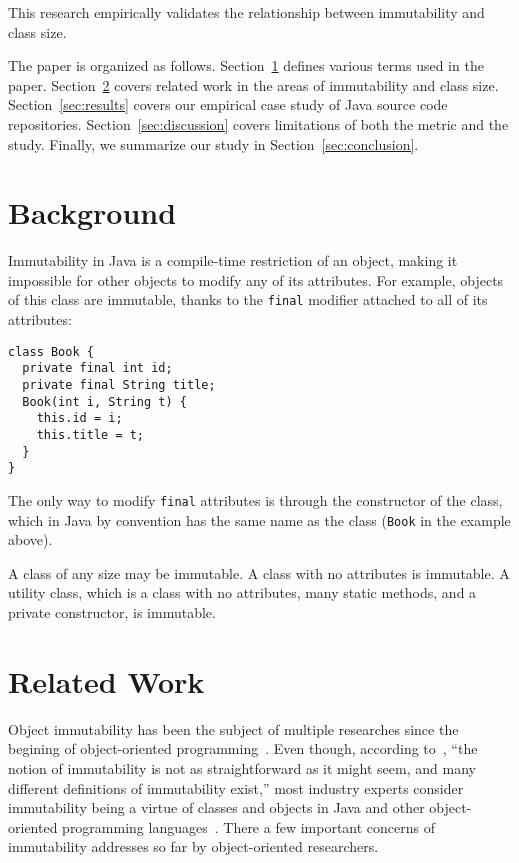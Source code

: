 \documentclass[3p,times,procedia]{elsarticle}
\begin{document}
This research empirically validates the relationship between immutability
and class size.

The paper is organized as follows.
Section~\ref{sec:background} defines various terms used in the paper.
Section~\ref{sec:related} covers related work in the areas of immutability and class size.
Section~\ref{sec:results} covers our empirical case study of \thetotalrepos{} Java source code repositories.
Section~\ref{sec:discussion} covers limitations of both the metric and the study.
Finally, we summarize our study in Section~\ref{sec:conclusion}.

\section{Background}
\label{sec:background}

Immutability in Java is a compile-time restriction of an object, making it
impossible for other objects to modify any of its attributes. For example,
objects of this class are immutable, thanks to the \texttt{final} modifier
attached to all of its attributes:

\begin{verbatim}
class Book {
  private final int id;
  private final String title;
  Book(int i, String t) {
    this.id = i;
    this.title = t;
  }
}
\end{verbatim}

The only way to modify \texttt{final} attributes is through the constructor
of the class, which in Java by convention has the same name as the class (\texttt{Book}
in the example above).

A class of any size may be immutable. A class with no attributes is immutable.
A utility class, which is a class with no attributes, many static methods,
and a private constructor, is immutable.

\section{Related Work}
\label{sec:related}

Object immutability has been the subject of multiple researches since
the begining of object-oriented programming~\citep{hakonen1999,porat2000,lea2000,taivalsaari1993}.
Even though, according to~\citet{potanin2013},
``the notion of immutability is not as straightforward as it might seem, and many
different definitions of immutability exist,'' most industry experts consider
immutability being a virtue of classes and objects in Java and other
object-oriented programming languages~\citep{bloch2016}. There a few important
concerns of immutability addresses so far by object-oriented researchers.
\end{document}
